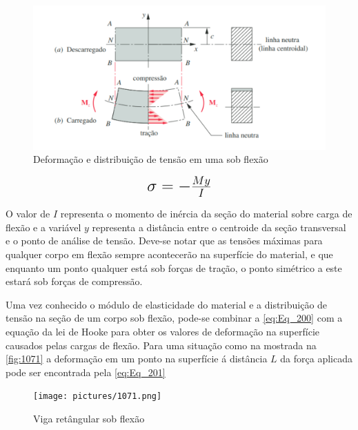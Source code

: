 \begin{figure}[htb]
	\caption{\label{fig:1070} Deformação e distribuição de tensão em uma sob flexão}
	\begin{center}
		\includegraphics[width=\textwidth]{pictures/1070.png}
	\end{center}
\end{figure}

\begin{equation}\label{eq:Eq_200}%
\mbox{\fontsize{17.28}{21.6}\selectfont\( %
\sigma = - \frac{My}{I}
\)} %
\end{equation}

%
%
%
%

\hfill

O valor de $I$ representa o momento de inércia da seção do material sobre carga de flexão e a variável $y$ representa a distância entre o centroide da seção transversal
e o ponto de análise de tensão.
Deve-se notar que as tensões máximas para qualquer corpo em flexão sempre acontecerão na superfície do material, e que enquanto um ponto qualquer está sob forças de tração,
o ponto simétrico a este estará sob forças de compressão.

Uma vez conhecido o módulo de elasticidade do material e a distribuição de tensão na seção de um corpo sob flexão,
pode-se combinar a \autoref{eq:Eq_200} com a equação da lei de Hooke para obter os valores de deformação na superfície
causados pelas cargas de flexão.
Para uma situação como na mostrada na \autoref{fig:1071} a deformação em um ponto na superfície á distância $ L $ da força aplicada pode ser encontrada pela \autoref{eq:Eq_201}

\begin{figure}[htb]
	\caption{\label{fig:1071} Viga retângular sob flexão}
	\begin{center}
		\texttt{[image: pictures/1071.png]}
	\end{center}
	\fonte{\autocite{}}
\end{figure}

